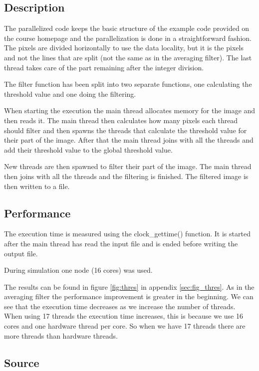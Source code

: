 \documentclass[a4paper, 12pt]{article}
\begin{document}
\subsection{Description}
\label{sec:desc2}
The parallelized code keeps the basic structure of the example code provided on
the course homepage and the parallelization is done in a straightforward
fashion. The pixels are divided horizontally to use the data locality, but it is
the pixels and not the lines that are split (not the same as in the averaging
filter). The last thread takes care of the part remaining after the integer
division.

The filter function has been split into two separate functions, one calculating
the threshold value and one doing the filtering.

When starting the execution the main thread allocates memory for the image and
then reads it. The main thread then calculates how many pixels each thread
should filter and then spawns the threads that calculate the threshold value for
their part of the image. After that the main thread joins with all the threads
and add their threshold value to the global threshold value.

New threads are then spawned to filter their part of the image. The main thread
then joins with all the threads and the filtering is finished. The filtered
image is then written to a file.

\subsection{Performance}

The execution time is measured using the clock\_gettime() function. It is
started after the main thread has read the input file and is ended before
writing the output file.

During simulation one node (16 cores) was used.

The results can be found in figure \ref{fig:thres} in appendix
\ref{sec:fig_thres}. As in the averaging filter the performance improvement is
greater in the beginning. We can see that the execution time decreases as we
increase the number of threads. When using 17 threads the execution time
increases, this is because we use 16 cores and one hardware thread per core. So
when we have 17 threads there are more threads than hardware threads. 

\subsection{Source}
\end{document}
